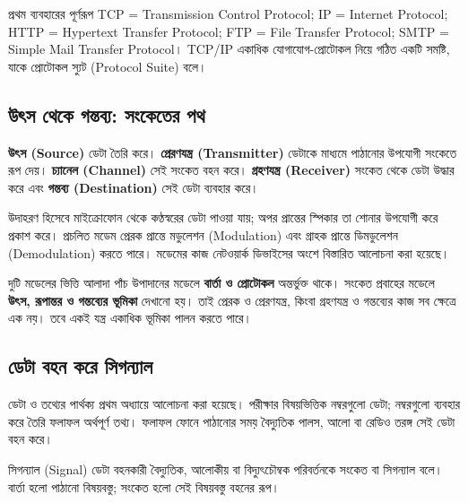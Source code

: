 \begin{keypointbox}{প্রথম ব্যবহারের পূর্ণরূপ}
TCP = Transmission Control Protocol; IP = Internet Protocol; HTTP = Hypertext Transfer Protocol; FTP = File Transfer Protocol; SMTP = Simple Mail Transfer Protocol। TCP/IP একাধিক যোগাযোগ-প্রোটোকল নিয়ে গঠিত একটি সমষ্টি, যাকে প্রোটোকল স্যুট (Protocol Suite) বলে।
\end{keypointbox}

\subsection{উৎস থেকে গন্তব্য: সংকেতের পথ}
\label{ch2:c01-03}
\noindent\begin{minipage}{\linewidth}
\centering
{}
\par\raggedright{}
\end{minipage}
\textbf{উৎস (Source)} ডেটা তৈরি করে। \textbf{প্রেরণযন্ত্র (Transmitter)} ডেটাকে মাধ্যমে পাঠানোর উপযোগী সংকেতে রূপ দেয়। \textbf{চ্যানেল (Channel)} সেই সংকেত বহন করে। \textbf{গ্রহণযন্ত্র (Receiver)} সংকেত থেকে ডেটা উদ্ধার করে এবং \textbf{গন্তব্য (Destination)} সেই ডেটা ব্যবহার করে।

উদাহরণ হিসেবে মাইক্রোফোন থেকে কণ্ঠস্বরের ডেটা পাওয়া যায়; অপর প্রান্তের স্পিকার তা শোনার উপযোগী করে প্রকাশ করে। প্রচলিত মডেম প্রেরক প্রান্তে মডুলেশন (Modulation) এবং গ্রাহক প্রান্তে ডিমডুলেশন (Demodulation) করতে পারে। মডেমের কাজ নেটওয়ার্ক ডিভাইসের অংশে বিস্তারিত আলোচনা করা হয়েছে।

\begin{mistakebox}{দুটি মডেলের ভিত্তি আলাদা}
পাঁচ উপাদানের মডেলে \textbf{বার্তা ও প্রোটোকল} অন্তর্ভুক্ত থাকে। সংকেত প্রবাহের মডেলে \textbf{উৎস, রূপান্তর ও গন্তব্যের ভূমিকা} দেখানো হয়। তাই প্রেরক ও প্রেরণযন্ত্র, কিংবা গ্রহণযন্ত্র ও গন্তব্যের কাজ সব ক্ষেত্রে এক নয়। তবে একই যন্ত্র একাধিক ভূমিকা পালন করতে পারে।
\end{mistakebox}

\subsection{ডেটা বহন করে সিগন্যাল}
\label{ch2:c01-04}
ডেটা ও তথ্যের পার্থক্য প্রথম অধ্যায়ে আলোচনা করা হয়েছে। পরীক্ষার বিষয়ভিত্তিক নম্বরগুলো ডেটা; নম্বরগুলো ব্যবহার করে তৈরি ফলাফল অর্থপূর্ণ তথ্য। ফলাফল ফোনে পাঠানোর সময় বৈদ্যুতিক পালস, আলো বা রেডিও তরঙ্গ সেই ডেটা বহন করে।
\begin{definitionbox}{সিগন্যাল (Signal)}
ডেটা বহনকারী বৈদ্যুতিক, আলোকীয় বা বিদ্যুৎচৌম্বক পরিবর্তনকে সংকেত বা সিগন্যাল বলে। বার্তা হলো পাঠানো বিষয়বস্তু; সংকেত হলো সেই বিষয়বস্তু বহনের রূপ।
\end{definitionbox}

